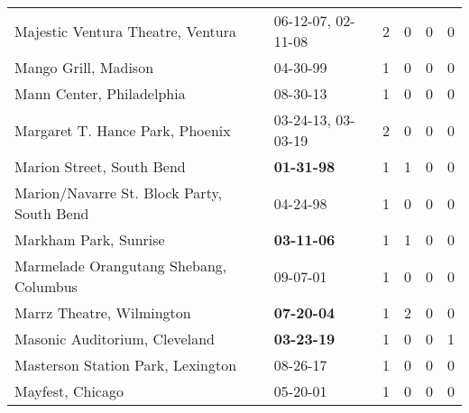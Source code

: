\begin{longtable}{p{}p{}p{}p{}p{}p{}}
                                            Majestic Ventura Theatre, Ventura &                    06-12-07\textsuperscript{}, 02-11-08\textsuperscript{} &  2 &  0 &  0 &  0 \\
                                                         Mango Grill, Madison &                                                04-30-99\textsuperscript{} &  1 &  0 &  0 &  0 \\
                                                    Mann Center, Philadelphia &                                                08-30-13\textsuperscript{} &  1 &  0 &  0 &  0 \\
                                              Margaret T. Hance Park, Phoenix &                    03-24-13\textsuperscript{}, 03-03-19\textsuperscript{} &  2 &  0 &  0 &  0 \\
                                                    Marion Street, South Bend &                                       \textbf{01-31-98\textsuperscript{}} &  1 &  1 &  0 &  0 \\
                                   Marion/Navarre St. Block Party, South Bend &                                                04-24-98\textsuperscript{} &  1 &  0 &  0 &  0 \\
                                                        Markham Park, Sunrise &                                       \textbf{03-11-06\textsuperscript{}} &  1 &  1 &  0 &  0 \\
                                       Marmelade Orangutang Shebang, Columbus &                                                09-07-01\textsuperscript{} &  1 &  0 &  0 &  0 \\
                                                    Marrz Theatre, Wilmington &                                       \textbf{07-20-04\textsuperscript{}} &  1 &  2 &  0 &  0 \\
                                                Masonic Auditorium, Cleveland &                                       \textbf{03-23-19\textsuperscript{}} &  1 &  0 &  0 &  1 \\
                                            Masterson Station Park, Lexington &                                                08-26-17\textsuperscript{} &  1 &  0 &  0 &  0 \\
                                                             Mayfest, Chicago &                                                05-20-01\textsuperscript{} &  1 &  0 &  0 &  0 \\

\end{longtable}
